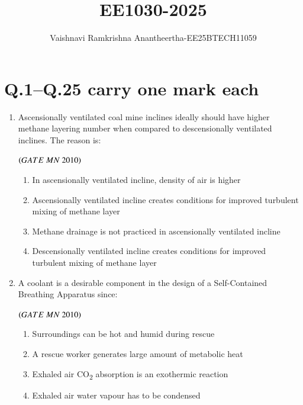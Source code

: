 \documentclass{article}
\title{\Huge EE1030-2025}
\author{Vaishnavi Ramkrishna Anantheertha-EE25BTECH11059}
\date{}
\begin{document}
\maketitle

\section*{Q.1--Q.25 carry one mark each}

\begin{enumerate}[label=Q.\arabic*., itemsep=1em, leftmargin=0pt, itemindent=*, labelsep=0.5em]

    \item Ascensionally ventilated coal mine inclines ideally should have higher methane layering number when compared to descensionally ventilated inclines. The reason is:
    \\
    \begin{flushright}
        \hfill$\left(GATE\ MN\ 2010\right)$
    \begin{enumerate}[label=(\Alph*), leftmargin=4em, align=left]
        \item In ascensionally ventilated incline, density of air is higher
        \item Ascensionally ventilated incline creates conditions for improved turbulent mixing of methane layer
        \item Methane drainage is not practiced in ascensionally ventilated incline
        \item Descensionally ventilated incline creates conditions for improved turbulent mixing of methane layer
        \end{enumerate}
        \end{flushright}
    

    \item A coolant is a desirable component in the design of a Self-Contained Breathing Apparatus since:
    \\
    \begin{flushright}
    \hfill$\left(GATE\ MN\ 2010\right)$
    \bigskip
    \end{flushright}
    \begin{enumerate}[label=(\Alph*), leftmargin=4em, align=left]
    \item Surroundings can be hot and humid during rescue
    \item A rescue worker generates large amount of metabolic heat
     \item Exhaled air CO\textsubscript{2} absorption is an exothermic reaction
     \item Exhaled air water vapour has to be condensed
        

\end{enumerate}
\end{enumerate}
\end{document}
